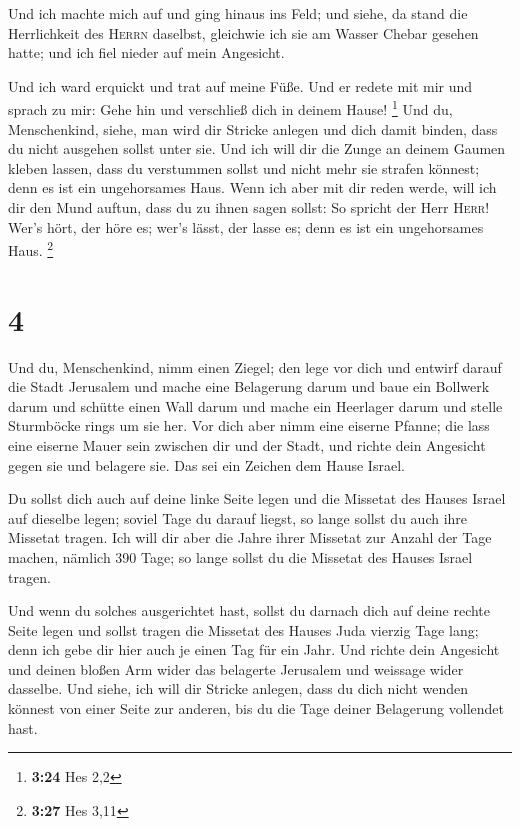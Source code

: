  Und ich machte mich auf und ging hinaus ins Feld; und
siehe, da stand die Herrlichkeit des \textsc{Herrn} daselbst, gleichwie
ich sie am Wasser Chebar gesehen hatte; und ich fiel nieder auf mein
Angesicht.

 Und ich ward erquickt und trat auf meine Füße. Und er
redete mit mir und sprach zu mir: Gehe hin und verschließ dich in deinem
Hause! \footnote{\textbf{3:24} Hes 2,2}  Und du,
Menschenkind, siehe, man wird dir Stricke anlegen und dich damit binden,
dass du nicht ausgehen sollst unter sie.  Und ich will
dir die Zunge an deinem Gaumen kleben lassen, dass du verstummen sollst
und nicht mehr sie strafen könnest; denn es ist ein ungehorsames Haus.
 Wenn ich aber mit dir reden werde, will ich dir den Mund
auftun, dass du zu ihnen sagen sollst: So spricht der Herr
\textsc{Herr}! Wer's hört, der höre es; wer's lässt, der lasse es; denn
es ist ein ungehorsames Haus. \footnote{\textbf{3:27} Hes 3,11}

\hypertarget{section-1}{%
\section{4}\label{section-1}}

 Und du, Menschenkind, nimm einen Ziegel; den lege vor
dich und entwirf darauf die Stadt Jerusalem  und mache
eine Belagerung darum und baue ein Bollwerk darum und schütte einen Wall
darum und mache ein Heerlager darum und stelle Sturmböcke rings um sie
her.  Vor dich aber nimm eine eiserne Pfanne; die lass
eine eiserne Mauer sein zwischen dir und der Stadt, und richte dein
Angesicht gegen sie und belagere sie. Das sei ein Zeichen dem Hause
Israel.

 Du sollst dich auch auf deine linke Seite legen und die
Missetat des Hauses Israel auf dieselbe legen; soviel Tage du darauf
liegst, so lange sollst du auch ihre Missetat tragen.  Ich
will dir aber die Jahre ihrer Missetat zur Anzahl der Tage machen,
nämlich 390 Tage; so lange sollst du die Missetat des Hauses Israel
tragen.

 Und wenn du solches ausgerichtet hast, sollst du darnach
dich auf deine rechte Seite legen und sollst tragen die Missetat des
Hauses Juda vierzig Tage lang; denn ich gebe dir hier auch je einen Tag
für ein Jahr.  Und richte dein Angesicht und deinen bloßen
Arm wider das belagerte Jerusalem und weissage wider dasselbe.
 Und siehe, ich will dir Stricke anlegen, dass du dich
nicht wenden könnest von einer Seite zur anderen, bis du die Tage deiner
Belagerung vollendet hast.

